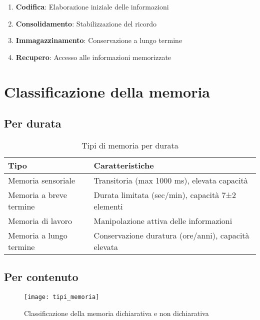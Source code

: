 \documentclass[11pt]{article}
\begin{document}
\begin{enumerate}
    \item \textbf{Codifica}: Elaborazione iniziale delle informazioni
    \item \textbf{Consolidamento}: Stabilizzazione del ricordo
    \item \textbf{Immagazzinamento}: Conservazione a lungo termine
    \item \textbf{Recupero}: Accesso alle informazioni memorizzate
\end{enumerate}

\section*{Classificazione della memoria}

\subsection*{Per durata}
\begin{table}[h]
\centering
\caption{Tipi di memoria per durata}
\begin{tabular}{p{5cm}p{10cm}}
\toprule
\textbf{Tipo} & \textbf{Caratteristiche} \\
\midrule
Memoria sensoriale & Transitoria (max 1000 ms), elevata capacità \\
Memoria a breve termine & Durata limitata (sec/min), capacità 7±2 elementi \\
Memoria di lavoro & Manipolazione attiva delle informazioni \\
Memoria a lungo termine & Conservazione duratura (ore/anni), capacità elevata \\
\bottomrule
\end{tabular}
\end{table}

\subsection*{Per contenuto}
\begin{figure}[h]
    \centering
    \texttt{[image: tipi\_memoria]} %
    \caption{Classificazione della memoria dichiarativa e non dichiarativa}
    \label{fig:tipi_memoria}
\end{figure}
\end{document}
